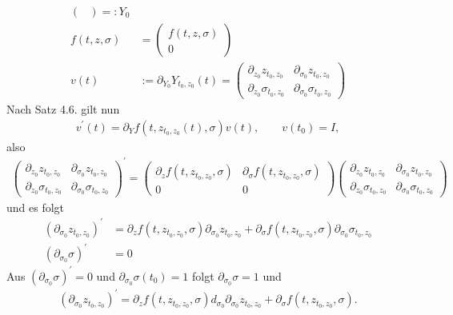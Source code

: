 \begin{solution}
\begin{enumerate}[label = \textbf{\alph*)}]
\begin{align*}
\begin{pmatrix}
  \end{pmatrix} =: Y_0 \\
    f(t,z,\sigma) &= \begin{pmatrix}
      f(t,z,\sigma) \\ 0
  \end{pmatrix} \\
  v(t) &:= \partial_{Y_0} Y_{t_0,z_0}(t) =
  \begin{pmatrix}
    \partial_{z_0} z_{t_0,z_0} & \partial_{\sigma_0} z_{t_0,z_0} \\
    \partial_{z_0} \sigma_{t_0,z_0} & \partial_{\sigma_0} \sigma_{t_0,z_0}
  \end{pmatrix}
\end{align*}
Nach Satz 4.6. gilt nun
\begin{align*}
  v^{\prime}(t) = \partial_Y f(t,z_{t_0,z_0}(t), \sigma)v(t), \qquad v(t_0) = I,
\end{align*}
also
\begin{align*}
\begin{pmatrix}
  \partial_{z_0} z_{t_0,z_0} & \partial_{\sigma_0} z_{t_0,z_0} \\
  \partial_{z_0} \sigma_{t_0,z_0} & \partial_{\sigma_0} \sigma_{t_0,z_0}
\end{pmatrix}^{\prime}
=
\begin{pmatrix}
  \partial_{z} f(t,z_{t_0,z_0}, \sigma) & \partial_{\sigma} f(t,z_{t_0,z_0}, \sigma) \\
  0 & 0
\end{pmatrix}
\begin{pmatrix}
  \partial_{z_0} z_{t_0,z_0} & \partial_{\sigma_0} z_{t_0,z_0} \\
  \partial_{z_0} \sigma_{t_0,z_0} & \partial_{\sigma_0} \sigma_{t_0,z_0}
\end{pmatrix}
\end{align*}
und es folgt
\begin{align*}
  (\partial_{\sigma_0} z_{t_0,z_0})^{\prime} &= \partial_z f(t,z_{t_0,z_0},\sigma) \partial_{\sigma_0} z_{t_0,z_0}
  + \partial_{\sigma} f(t,z_{t_0,z_0},\sigma) \partial_{\sigma_0} \sigma_{t_0,z_0} \\
  (\partial_{\sigma_0} \sigma)^{\prime} &= 0
\end{align*}
Aus $(\partial_{\sigma_0} \sigma)^{\prime} = 0$ und $\partial_{\sigma_0}\sigma(t_0) = 1$
folgt $\partial_{\sigma_0} \sigma = 1$ und
\begin{align*}
  (\partial_{\sigma_0}z_{t_0,z_0})^{\prime} =
  \partial_z f(t,z_{t_0,z_0},\sigma)d_{\sigma_0}\partial_{\sigma_0} z_{t_0,z_0}
  + \partial_\sigma f(t,z_{t_0,z_0},\sigma).
\end{align*}
\end{enumerate}
\end{solution}
